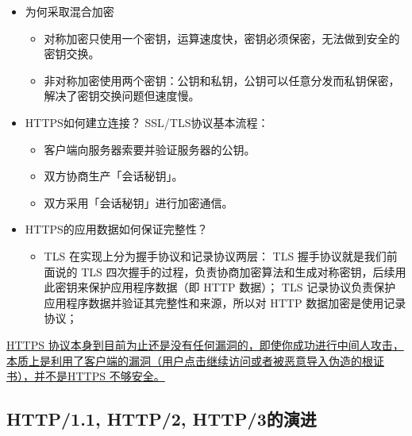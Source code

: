\documentclass[11pt]{article}
\begin{document}
\begin{itemize}
\begin{itemize}
\item 在通信建立前采用非对称加密的方式交换「会话秘钥」，后续就不再使用非对称加密。
\item 在通信过程中全部使用对称加密的「会话秘钥」的方式加密明文数据。
\end{itemize}
\item 为何采取混合加密
\begin{itemize}
\item 对称加密只使用一个密钥，运算速度快，密钥必须保密，无法做到安全的密钥交换。
\item 非对称加密使用两个密钥：公钥和私钥，公钥可以任意分发而私钥保密，解决了密钥交换问题但速度慢。
\end{itemize}
\item HTTPS如何建立连接？
SSL/TLS协议基本流程：
\begin{itemize}
\item 客户端向服务器索要并验证服务器的公钥。
\item 双方协商生产「会话秘钥」。
\item 双方采用「会话秘钥」进行加密通信。
\end{itemize}
\item HTTPS的应用数据如何保证完整性？
\begin{itemize}
\item TLS 在实现上分为握手协议和记录协议两层：
TLS 握手协议就是我们前面说的 TLS 四次握手的过程，负责协商加密算法和生成对称密钥，后续用此密钥来保护应用程序数据（即 HTTP 数据）；
TLS 记录协议负责保护应用程序数据并验证其完整性和来源，所以对 HTTP 数据加密是使用记录协议；
\end{itemize}
\end{itemize}
\uline{HTTPS 协议本身到目前为止还是没有任何漏洞的，即使你成功进行中间人攻击，本质上是利用了客户端的漏洞（用户点击继续访问或者被恶意导入伪造的根证书），并不是HTTPS 不够安全。}

\subsection{HTTP/1.1, HTTP/2, HTTP/3的演进}
\label{sec:org2bae09c}
\end{document}
